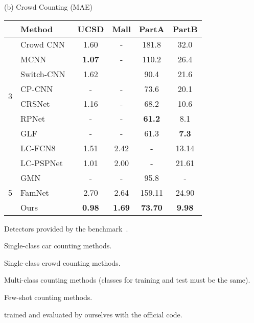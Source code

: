 \documentclass[10pt,twocolumn,letterpaper]{article}
\begin{document}
\begin{table}[t]
\begin{minipage}[t]{0.5\textwidth}
\centering
\scriptsize
\setlength\tabcolsep{8pt}
(b) Crowd Counting (MAE) \\
\begin{threeparttable}
\begin{tabular}{clcccc}
\toprule
 & Method & UCSD & Mall & PartA & PartB \\
\midrule
\multirow{8}{*}{3}
& Crowd CNN~\cite{crowd_cnn}   & 1.60    & -        & 181.8     & 32.0     \\
& MCNN~\cite{mcnn}             & \textbf{1.07} & -  & 110.2     & 26.4     \\
& Switch-CNN~\cite{switch_cnn} & 1.62    &          & 90.4      & 21.6     \\
& CP-CNN~\cite{cp_cnn}         & -       & -        & 73.6      & 20.1     \\
& CRSNet~\cite{crsnet}         & 1.16    & -        & 68.2      & 10.6     \\
& RPNet~\cite{rpnet}           & -       & -        & \textbf{61.2} & 8.1      \\
& GLF~\cite{glf}               & -       & -        & 61.3          & \textbf{7.3}      \\
\cmidrule{1-6}
\multirow{2}{*}{4}
& LC-FCN8~\cite{blobs}         & 1.51      & 2.42      & -           & 13.14    \\
& LC-PSPNet~\cite{blobs}       & 1.01      & 2.00      & -           & 21.61    \\
\cmidrule{1-6}
\multirow{3}{*}{5}
& GMN~\cite{gmn}               & -         & -         & 95.8        & -        \\
& FamNet~\cite{famnet}         & 2.70\tnote{\dag} & 2.64\tnote{\dag} & 159.11\tnote{\dag} & 24.90\tnote{\dag} \\
\cmidrule{2-6}
& Ours & \textbf{0.98} & \textbf{1.69} & \textbf{73.70} & \textbf{9.98}     \\
\bottomrule
\end{tabular}
\end{threeparttable}
\end{minipage}
\begin{threeparttable}
\begin{tablenotes}
\scriptsize
\item[1] Detectors provided by the benchmark~\cite{lpn}.
\item[2] Single-class car counting methods. 
\item[3] Single-class crowd counting methods. 
\item[4] Multi-class counting methods (classes for training and test must be the same). 
\item[5] Few-shot counting methods. 
\item[] trained and evaluated by ourselves with the official code.
\end{tablenotes}
\end{threeparttable}
\label{appendix:tab:res_car_crowd}
\end{table}
\end{document}
